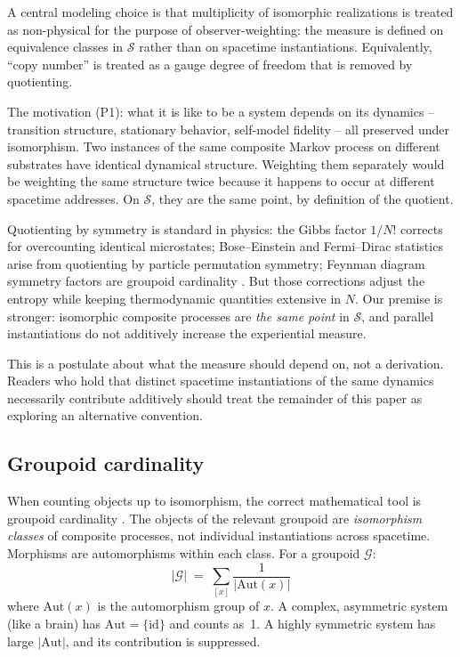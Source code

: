 \documentclass[12pt]{article}
\theoremstyle{remark}
\newcommand{\Aut}{\mathrm{Aut}}
\begin{document}
A central modeling choice is that multiplicity of isomorphic realizations is treated as non-physical for the purpose of observer-weighting: the measure is defined on equivalence classes in $\mathcal{S}$ rather than on spacetime instantiations. Equivalently, ``copy number'' is treated as a gauge degree of freedom that is removed by quotienting.

The motivation (P1): what it is like to be a system depends on its dynamics -- transition structure, stationary behavior, self-model fidelity -- all preserved under isomorphism. Two instances of the same composite Markov process on different substrates have identical dynamical structure. Weighting them separately would be weighting the same structure twice because it happens to occur at different spacetime addresses. On $\mathcal{S}$, they are the same point, by definition of the quotient.

Quotienting by symmetry is standard in physics: the Gibbs factor $1/N!$ corrects for overcounting identical microstates; Bose--Einstein and Fermi--Dirac statistics arise from quotienting by particle permutation symmetry; Feynman diagram symmetry factors are groupoid cardinality \cite{baez-dolan2001}. But those corrections adjust the entropy while keeping thermodynamic quantities extensive in $N$. Our premise is stronger: isomorphic composite processes are \emph{the same point} in $\mathcal{S}$, and parallel instantiations do not additively increase the experiential measure.

This is a postulate about what the measure should depend on, not a derivation. Readers who hold that distinct spacetime instantiations of the same dynamics necessarily contribute additively should treat the remainder of this paper as exploring an alternative convention.

\subsection{Groupoid cardinality}\label{sec:groupoid}

When counting objects up to isomorphism, the correct mathematical tool is groupoid cardinality \cite{baez-dolan2001}. The objects of the relevant groupoid are \emph{isomorphism classes} of composite processes, not individual instantiations across spacetime. Morphisms are automorphisms within each class. For a groupoid $\mathcal{G}$:
\begin{equation}\label{eq:groupoid}
  |\mathcal{G}| \;=\; \sum_{[x]} \frac{1}{|\Aut(x)|}
\end{equation}
where $\Aut(x)$ is the automorphism group of $x$. A complex, asymmetric system (like a brain) has $\Aut = \{\mathrm{id}\}$ and counts as~1. A highly symmetric system has large $|\Aut|$, and its contribution is suppressed.
\end{document}
